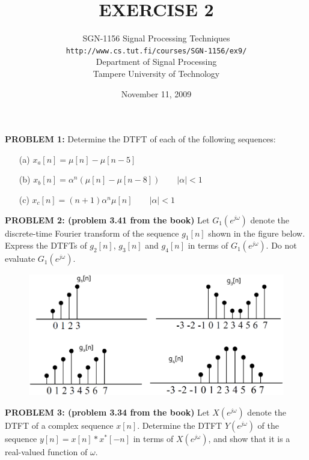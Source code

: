\documentclass[11pt]{article}
\title{\large{\textbf{EXERCISE 2}}}
\author{SGN-1156 Signal Processing Techniques\\
\texttt{http://www.cs.tut.fi/courses/SGN-1156/ex9/}\\
Department of Signal Processing\\
Tampere University of Technology}
\date{November 11, 2009}
\begin{document}
\maketitle



\textbf{PROBLEM 1:} Determine the DTFT of each of the following sequences:

\begin{itemize}
\item[(a)] $x_a[n] = \mu[n]-\mu[n-5]$
\item[(b)] $x_b[n] = \alpha^n\left(\mu[n]-\mu[n-8]\right) \qquad |\alpha|< 1$
\item[(c)] $x_c[n] = (n+1)\alpha^n\mu[n] \qquad |\alpha|<1$
\end{itemize}  



\vspace{1cm}




\textbf{PROBLEM 2: (problem 3.41 from the book)} Let $G_1(e^{j\omega})$ denote the discrete-time Fourier transform of the sequence $g_1[n]$ shown in the figure below. Express the DTFTs of $g_2[n]$, $g_3[n]$ and $g_4[n]$ in terms of $G_1(e^{j\omega})$. Do not evaluate $G_1(e^{j\omega})$.


\begin{figure}[ht!]
\centering
\includegraphics[width=.8\textwidth]{fig4.eps}
\end{figure}


\vspace{1cm}



\textbf{PROBLEM 3: (problem 3.34 from the book)} Let $X(e^{j\omega})$ denote the DTFT of a complex sequence $x[n]$. Determine the DTFT $Y(e^{j\omega})$ of the sequence $y[n]=x[n]\ast x^*[-n]$ in terms of $X(e^{j\omega})$, and show that it is a real-valued function of $\omega$.
\end{document}
